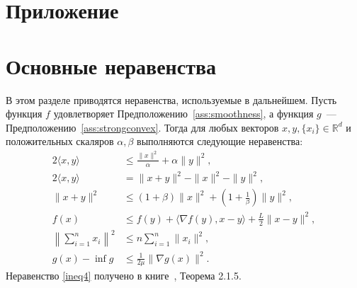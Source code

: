 \section*{Приложение}

\section{Основные неравенства}\label{sec:basicineq}
В этом разделе приводятся неравенства, используемые в дальнейшем. Пусть функция $f$ удовлетворяет Предположению~\ref{ass:smoothness}, а функция $g$~---  Предположению~\ref{ass:strongconvex}. Тогда для любых векторов $x, y, \{x_i\}\in\mathbb{R}^d$ и положительных скаляров $\alpha, \beta$ выполняются следующие неравенства:
\begin{align}
\label{ineq3} \tag{Скалярное} 2\langle x, y \rangle & \leqslant \frac{\|x\|^2}{\alpha} + \alpha \|y\|^2, \\
\label{ineq:norm} \tag{Норма} 2\langle x, y \rangle & = \|x + y\|^2 - \|x\|^2 - \|y\|^2, \\
\label{ineq:square} \tag{Квадратичное} \|x + y\|^2 & \leqslant (1 + \beta)\|x\|^2 + \left(1 + \frac{1}{\beta}\right)\|y\|^2, \\
\label{ineq4} \tag{Липшицево} f(x) & \leqslant f(y) + \langle \nabla f(y), x-y \rangle + \frac{L}{2} \|x-y\|^2,\\
\label{ineq1} \tag{Коши–Буняковский}  \left\|\sum_{i=1}^{n} x_i\right\|^2 & \leqslant  n \sum_{i=1}^{n} \|x_i\|^2, \\
\label{PL} \tag{PL-условие}  g(x) - \inf g  &\leqslant \frac{1}{2\mu} \|\nabla g(x)\|^2.
\end{align}
Неравенство \eqref{ineq4} получено в книге~\citep{nesterov2018lectures}, Теорема 2.1.5.
